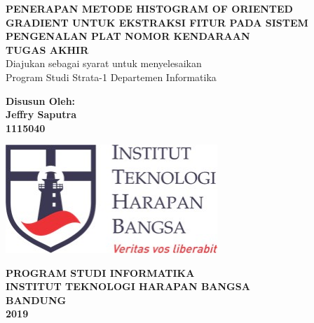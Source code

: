 \begin{titlepage}
\begin{center}
	\onehalfspacing
	{\large \bfseries PENERAPAN METODE HISTOGRAM OF ORIENTED GRADIENT UNTUK EKSTRAKSI FITUR PADA SISTEM PENGENALAN PLAT NOMOR KENDARAAN\\
	\vspace{1.5cm}
	 \large TUGAS AKHIR}\\
           Diajukan sebagai syarat untuk menyelesaikan\\ Program Studi Strata-1 Departemen Informatika

	\vspace{1.5cm}
          {\bfseries Disusun Oleh: \\
           Jeffry Saputra \\
	1115040}
	
	\vspace{1.5cm}
	\includegraphics[width=8cm]{images/ithb.jpg}
	
	
	\vspace{3.5cm}
	
{\large \bfseries PROGRAM STUDI INFORMATIKA \\
INSTITUT TEKNOLOGI HARAPAN BANGSA \\
BANDUNG\\
2019}

	
\end{center}

\end{titlepage}

\newpage
